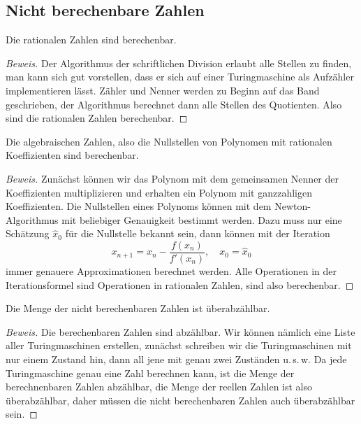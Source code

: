 \subsection{Nicht berechenbare Zahlen}

\begin{satz}
Die rationalen Zahlen sind berechenbar.
\end{satz}

\begin{proof}[Beweis]
Der Algorithmus der schriftlichen Division erlaubt alle Stellen
zu finden, man kann sich gut vorstellen, dass er sich auf einer
Turingmaschine als Aufzähler implementieren lässt. Zähler und
Nenner werden zu Beginn auf das Band geschrieben, der Algorithmus
berechnet dann alle Stellen des Quotienten. Also sind die rationalen
Zahlen berechenbar.
\end{proof}

\begin{satz}Die algebraischen Zahlen, also die Nullstellen von
Polynomen mit rationalen Koeffizienten sind berechenbar.
\end{satz}

\begin{proof}[Beweis]
Zunächst können wir das Polynom mit dem gemeinsamen Nenner der
Koeffizienten multiplizieren und erhalten ein Polynom mit ganzzahligen
Koeffizienten.
Die Nullstellen eines Polynoms können mit dem Newton-Algorithmus
mit beliebiger Genauigkeit bestimmt werden. Dazu muss nur eine
Schätzung $\hat x_0$ für die Nullstelle bekannt sein, dann können
mit der Iteration
\[
x_{n+1}=x_n-\frac{f(x_n)}{f'(x_n)},\quad x_0 = \hat x_0
\]
immer genauere Approximationen berechnet werden. Alle Operationen
in der Iterationsformel sind Operationen in rationalen Zahlen, sind
also berechenbar.
\end{proof}

\begin{satz}
Die Menge der nicht berechenbaren Zahlen ist überabzählbar.
\end{satz}

\begin{proof}[Beweis]
Die berechenbaren Zahlen sind abzählbar. Wir können nämlich
eine Liste aller Turingmaschinen erstellen, zunächst schreiben
wir die Turingmaschinen mit nur einem Zustand hin, dann all jene
mit genau zwei Zuständen u.\,s.\,w. Da jede Turingmaschine genau eine
Zahl berechnen kann, ist die Menge der berechnenbaren Zahlen abzählbar,
die Menge der reellen Zahlen ist also überabzählbar, daher müssen die
nicht berechenbaren Zahlen auch überabzählbar sein.
\end{proof}

